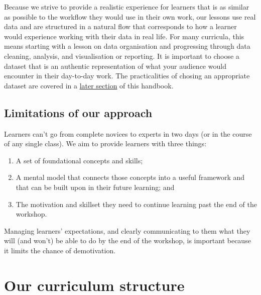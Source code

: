 \documentclass[
]{book}
\providecommand{\tightlist}{%
  \setlength{\itemsep}{0pt}\setlength{\parskip}{0pt}}
\begin{document}
Because we strive to provide a realistic experience for learners
that is as similar as possible to the workflow they would use
in their own work, our lessons use real data and are structured
in a natural flow that corresponds to how a learner would experience
working with their data in real life. For many curricula, this
means starting with a lesson on data organisation and progressing
through data cleaning, analysis, and visualisation or reporting.
It is important to choose a dataset that is an authentic
representation of what your audience would encounter in their
day-to-day work. The practicalities of chosing an appropriate
dataset are covered in a \protect\hyperlink{picking-a-dataset}{later section}
of this handbook.

\hypertarget{limitations-of-our-approach}{%
\section{Limitations of our approach}\label{limitations-of-our-approach}}

Learners can't go from complete novices to experts in two days (or
in the course of any single class). We aim to provide learners with
three things:

\begin{enumerate}
\def\labelenumi{\arabic{enumi}.}
\tightlist
\item
  A set of foundational concepts and skills;
\item
  A mental model that connects those concepts into a useful
  framework and that can be built upon in their future learning; and
\item
  The motivation and skillset they need to continue learning
  past the end of the workshop.
\end{enumerate}

Managing learners' expectations, and clearly communicating to
them what they will (and won't) be able to do by the end of the
workshop, is important because it limits the chance of demotivation.

\hypertarget{our-curriculum-structure}{%
\chapter{Our curriculum structure}\label{our-curriculum-structure}}
\end{document}
